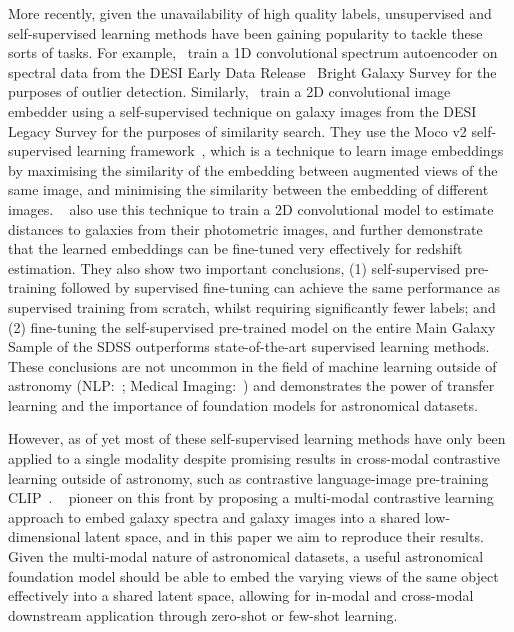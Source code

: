 More recently, given the unavailability of high quality labels, unsupervised and self-supervised learning methods have been
gaining popularity to tackle these sorts of tasks.
For example,~\cite{liang2023} train a 1D convolutional spectrum autoencoder on spectral data from the DESI Early Data
Release~\citep{desiearly2023} Bright Galaxy Survey for the purposes of outlier detection.
Similarly,~\cite{stein2021} train a 2D convolutional image embedder using a self-supervised technique on galaxy images
from the DESI Legacy Survey for the purposes of similarity search.
They use the Moco v2 self-supervised learning framework~\citep{moco2020, mocov22020}, which is a technique to learn image embeddings
by maximising the similarity of the embedding between augmented views of the same image, and minimising the similarity between
the embedding of different images.
~\cite{hayat2021} also use this technique to train a 2D convolutional model to estimate distances to galaxies from their
photometric images, and further demonstrate that the learned embeddings can be fine-tuned very effectively for redshift estimation.
They also show two important conclusions, (1) self-supervised pre-training followed by supervised fine-tuning can achieve
the same performance as supervised training from scratch, whilst requiring significantly fewer labels; and (2) fine-tuning
the self-supervised pre-trained model on the entire Main Galaxy Sample of the SDSS outperforms state-of-the-art supervised
learning methods.
These conclusions are not uncommon in the field of machine learning outside of astronomy
(NLP:~\cite{devlin2019, radford2018}; Medical Imaging:~\cite{shin2016}) and demonstrates the power of transfer learning
and the importance of foundation models for astronomical datasets.

However, as of yet most of these self-supervised learning methods have only been applied to a single modality despite
promising results in cross-modal contrastive learning outside of astronomy, such as contrastive language-image pre-training CLIP~\citep{radford2021}.
~\cite{astroclip} pioneer on this front by proposing a multi-modal contrastive learning approach to embed galaxy spectra
and galaxy images into a shared low-dimensional latent space, and in this paper we aim to reproduce their results.
Given the multi-modal nature of astronomical datasets, a useful astronomical foundation model should be able to embed
the varying views of the same object effectively into a shared latent space, allowing for in-modal and cross-modal downstream
application through zero-shot or few-shot learning.
